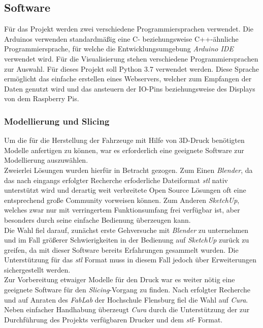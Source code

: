 \documentclass[.../Dokumentation.tex]{subfiles}
\begin{document}
    \subsection{Software}\label{sec-components-software}
    Für das Projekt werden zwei verschiedene Programmiersprachen verwendet. Die Arduinos verwenden standardmäßig eine C- beziehungsweise C++-ähnliche Programmiersprache, für welche die Entwicklungsumgebung \textit{Arduino IDE} verwendet wird. Für die Visualisierung stehen verschiedene Programmiersprachen zur Auswahl. Für dieses Projekt soll Python 3.7 verwendet werden. Diese Sprache ermöglicht das einfache erstellen eines Webservers, welcher zum Empfangen der Daten genutzt wird und das ansteuern der IO-Pins beziehungsweise des Displays von dem Raspberry Pis.
    
    \subsubsection{Modellierung und Slicing}\label{sec-components-software-model}
    Um die für die Herstellung der Fahrzeuge mit Hilfe von 3D-Druck benötigten 
    Modelle anfertigen zu können, war es erforderlich eine geeignete Software 
    zur Modellierung auszuwählen.\\
    Zweierlei Lösungen wurden hierfür in Betracht gezogen.
    Zum Einen \textit{Blender}, %
    da das nach eingangs erfolgter Recherche erfoderliche Dateiformat 
    \textit{stl} nativ unterstützt wird und derartig weit verbreitete Open 
    Source Lösungen oft eine entsprechend große Community vorweisen können.
    Zum Anderen \textit{SketchUp}, %
    welches zwar nur mit verringertem 
    Funktionsumfang frei verfügbar ist, aber besonders durch seine einfache 
    Bedienung überzeugen kann.\\
    Die Wahl fiel darauf, zunächst erste Gehversuche mit \textit{Blender} 
    zu unternehmen und im Fall größerer Schwierigkeiten in der Bedienung auf 
    \textit{SketchUp} zurück zu greifen, da mit dieser Software bereits 
    Erfahrungen gesammelt wurden. Die Unterstützung für das \textit{stl} Format 
    muss in diesem Fall jedoch über Erweiterungen sichergestellt werden.\\
    Zur Vorbereitung etwaiger Modelle für den Druck war es weiter nötig 
    eine geeignete Software für den \textit{Slicing}-Vorgang zu finden.
    Nach erfolgter Recherche und auf Anraten des \textit{FabLab} der Hochschule 
    Flensburg fiel die Wahl auf \textit{Cura}.%
    Neben einfacher Handhabung überzeugt \textit{Cura} durch die Unterstützung 
    der zur Durchführung des Projekts verfügbaren Drucker und dem \textit{stl}-
    Format.
\end{document}
